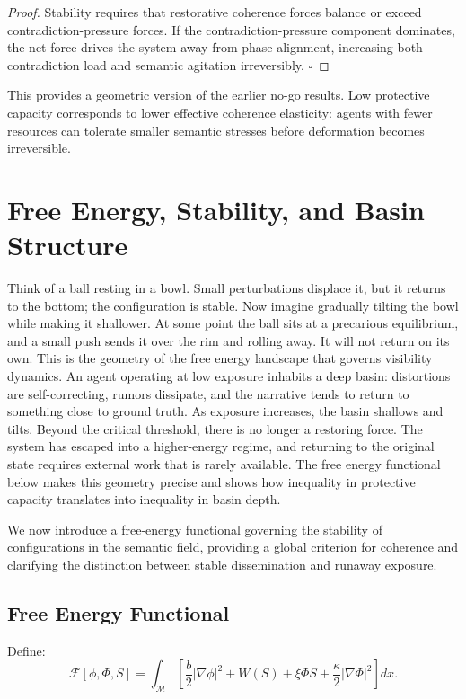 \documentclass[12pt,a4paper]{article}
\begin{document}
\begin{proof}
Stability requires that restorative coherence forces balance or exceed contradiction-pressure forces. If the contradiction-pressure component dominates, the net force drives the system away from phase alignment, increasing both contradiction load and semantic agitation irreversibly. \hfill$\square$
\end{proof}

This provides a geometric version of the earlier no-go results. Low protective capacity corresponds to lower effective coherence elasticity: agents with fewer resources can tolerate smaller semantic stresses before deformation becomes irreversible.

\section{Free Energy, Stability, and Basin Structure}

Think of a ball resting in a bowl. Small perturbations displace it, but it returns to the bottom; the configuration is stable. Now imagine gradually tilting the bowl while making it shallower. At some point the ball sits at a precarious equilibrium, and a small push sends it over the rim and rolling away. It will not return on its own. This is the geometry of the free energy landscape that governs visibility dynamics. An agent operating at low exposure inhabits a deep basin: distortions are self-correcting, rumors dissipate, and the narrative tends to return to something close to ground truth. As exposure increases, the basin shallows and tilts. Beyond the critical threshold, there is no longer a restoring force. The system has escaped into a higher-energy regime, and returning to the original state requires external work that is rarely available. The free energy functional below makes this geometry precise and shows how inequality in protective capacity translates into inequality in basin depth.

We now introduce a free-energy functional governing the stability of configurations in the semantic field, providing a global criterion for coherence and clarifying the distinction between stable dissemination and runaway exposure.

\subsection{Free Energy Functional}

Define:
\[
\mathcal{F}[\phi, \Phi, S]
=
\int_{\mathcal{M}}
\left[
\frac{b}{2}|\nabla \phi|^2
+
W(S)
+
\xi \Phi S
+
\frac{\kappa}{2}|\nabla \Phi|^2
\right] dx.
\]
\end{document}
